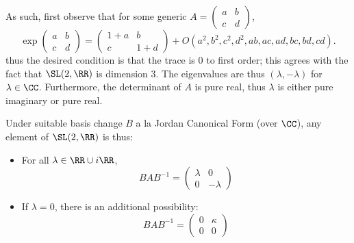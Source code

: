 \documentclass[11pt, headheight=30pt]{scrartcl}
\begin{document}
As such, first observe that for some generic
$A = \begin{pmatrix}a & b \\ c & d\end{pmatrix}$,
\[
    \exp\begin{pmatrix}
        a & b \\
        c & d
    \end{pmatrix} = \begin{pmatrix}
        1 + a & b \\
        c & 1 + d
    \end{pmatrix} + O(a^2, b^2, c^2, d^2, ab, ac, ad, bc, bd, cd).    
\]
thus the desired condition is that the trace is $0$ to
first order; this agrees with the fact that $\SL(2,\RR)$
is dimension $3$. The eigenvalues are thus $(\lambda, -\lambda)$
for $\lambda\in \CC$. Furthermore, the determinant of $A$ is
pure real, thus $\lambda$ is either pure imaginary or pure real.

Under suitable basis
change $B$ a la Jordan Canonical Form (over $\CC$),
any element of $\SL(2, \RR)$ is thus:
\begin{itemize}
    \item For all $\lambda\in \RR\cup i\RR$,
    \[
        BAB^{-1} = \begin{pmatrix}
            \lambda & 0 \\
            0 & -\lambda
        \end{pmatrix}
    \]
    \item If $\lambda = 0$, there is an additional
    possibility:
    \[
        BAB^{-1} = \begin{pmatrix}
            0 & \kappa \\
            0 & 0
        \end{pmatrix}
    \]
\end{itemize}
\end{document}
